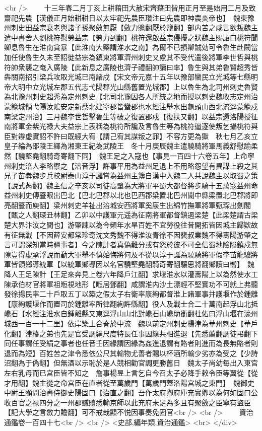 <br />
　　十三年春二月丁亥上耕藉田大赦宋齊藉田皆用正月至是始用二月及致齋祀先農【漢儀正月始耕耕日以太牢祀先農臣瓚注曰先農即神農炎帝也】　魏東豫州刺史田益宗衰老與諸子孫聚斂無厭【斂力贍翻厭於鹽翻】部内苦之咸言欲叛魏主遣中書舍人劉桃符慰勞益宗【勞力到翻】桃符還啟益宗侵擾之狀魏主賜詔曰桃符聞卿息魯生在淮南貪暴【此淮南大槩謂淮水之南】為爾不已損卿誠効可令魯生赴闕當加任使魯生久未至詔徙益宗為鎮東將軍濟州刺史又慮其不受代遣後將軍李世哲與桃符帥衆襲之奄入廣陵【此新息之廣陵也濟子禮翻帥讀曰率】魯生與其弟魯賢超秀皆犇關南招引梁兵攻取光城已南諸戍【宋文帝元嘉十五年以豫部蠻民立光城等七縣明帝大明中立光城左郡五代志弋陽郡光山縣舊置光城郡】上以魯生為北司州刺史魯賢為北豫州刺史超秀為定州刺史【北司北豫因各人所統之地而授以刺史魏收志定州治蒙籠城領弋陽汝隂安定新蔡北建寜郡皆蠻郡也水經注舉水出龜頭山西北流逕蒙籠戍南梁定州治】三月魏李世哲擊魯生等破之復置郡戍【復扶又翻】以益宗還洛陽授征南將軍金紫光禄大夫益宗上表稱為桃符所讒及言魯生等為桃符逼逐使叛乞攝桃符與臣對辯虚實詔不許曰既經大宥【謂己宥其謀叛之罪】不容方更為獄　秋七月乙亥立皇子綸為邵陵王繹為湘東王紀為武陵王　冬十月庚辰魏主遣驍騎將軍馬義舒慰諭柔然【驍堅堯翻騎奇寄翻下同】　魏王足之入寇也【事見一百四十六卷五年】上命寧州刺史涪人李略禦之【涪音浮】許事平用為益州足退上不用略怨望有異謀上殺之其兄子苗犇魏步兵校尉泰山淳于誕嘗為益州主簿自漢中入魏二人共說魏主以取蜀之策【說式芮翻】魏主信之辛亥以司徒高肇為大將軍平蜀大都督將步騎十五萬寇益州命益州刺史傅豎眼出巴北【巴北巴郡以北也巴西郡梁置北巴州閬中縣梁置北巴郡將即亮翻豎而庾翻】梁州刺史羊祉出涪城安西將軍奚康生出綿竹撫軍將軍甄琛出劍閣【甄之人翻琛丑林翻】乙卯以中護軍元遥為征南將軍都督鎮遏梁楚【此梁楚謂古梁楚大界汴汝之間也】游肇諫以為今頻年水旱百姓不宜勞役往昔開拓皆因城主歸欵故有征無戰【不因薛安都常珍奇沈文秀魏不得淮汝青徐不因裴叔業魏不得夀陽游肇之言可謂深知當時疆事者】今之陳計者真偽難分或有怨於彼不可全信蜀地險隘鎮戍無隙豈得虚承浮說而動大軍舉不慎始悔將何及不從以淳于誕為驍騎將軍假李苗龍驤將軍皆領鄉導統軍【以統軍鄉導因以名官驍堅堯翻騎奇寄翻驤思將翻鄉讀曰嚮】　魏降人王足陳計【王足來奔見上卷六年降戶江翻】求堰淮水以灌夀陽上以為然使水工陳承伯材官將軍祖暅視地形【暅居鄧翻】咸謂淮内沙土漂輕不堅實功不可就上弗聽發徐揚民率二十戶取五丁以築之假太子右衛率康絢都督淮上諸軍事并護堰作於鍾離【康絢護堰作而置司於鍾離率所律翻絢許縣翻】役人及戰士合二十萬南起浮山北抵巉石【水經注淮水自鍾離縣又東逕浮山山北對巉石山巉助銜翻杜佑曰浮山堰在濠州城西一百一十二里】依岸築土合脊於中流　魏以前定州刺史楊津為華州刺史【華戶化翻】津椿之弟也先是官受調絹尺度特長任事因緣共相進退【先悉薦翻調徒弔翻下同任事謂任受絹之事者也任音壬因緣謂因緣為姦進退謂有賂者則進而為長無賂者則退而為短】百姓苦之津令悉依公尺其輸物尤善者賜以杯酒所輸少劣亦為受之【少詩沼翻為于偽翻】但無酒以示恥於是人競相勸官調更勝舊日　魏太子尚幼每出入東宫左右乳母而已宫臣皆不知之　詹事楊昱上言乞自今召太子必降手敕令臣等翼從【從才用翻】魏主從之命宫臣在直者從至萬歲門【萬歲門蓋洛陽宫城之東門】　魏御史中尉王顯問治書侍御史陽固曰【治直之翻】吾作太府卿府庫充實卿以為何如固曰公收百官之禄四分之一州郡贓贖悉輸京師以此充府未足為多且有聚斂之臣寧有盜臣【記大學之言斂力贍翻】可不戒哉顯不悦因事奏免固官<br />
<br />
　　資治通鑑卷一百四十七<br />
<br />
<史部,編年類,資治通鑑>  <br>
   </div> 

